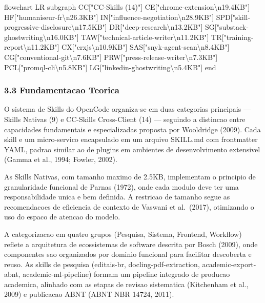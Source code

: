 \documentclass[
  12pt,
]{article}
\newenvironment{Shaded}{}{}
\newcommand{\NormalTok}[1]{#1}
\begin{document}
\begin{Shaded}
\begin{Highlighting}[]
\NormalTok{flowchart LR}
\NormalTok{subgraph CC["CC{-}Skills (14)"]}
\NormalTok{CE["chrome{-}extension\textbackslash{}n19.4KB"]}
\NormalTok{HF["humaniseur{-}fr\textbackslash{}n26.3KB"]}
\NormalTok{IN["influence{-}negotiation\textbackslash{}n28.9KB"]}
\NormalTok{SPD["skill{-}progressive{-}disclosure\textbackslash{}n17.5KB"]}
\NormalTok{DR["deep{-}research\textbackslash{}n13.2KB"]}
\NormalTok{SG["substack{-}ghostwriting\textbackslash{}n16.0KB"]}
\NormalTok{TAW["technical{-}article{-}writer\textbackslash{}n11.2KB"]}
\NormalTok{TR["training{-}report\textbackslash{}n11.2KB"]}
\NormalTok{CX["crxjs\textbackslash{}n10.9KB"]}
\NormalTok{SAS["snyk{-}agent{-}scan\textbackslash{}n8.4KB"]}
\NormalTok{CG["conventional{-}git\textbackslash{}n7.6KB"]}
\NormalTok{PRW["press{-}release{-}writer\textbackslash{}n7.3KB"]}
\NormalTok{PCL["promql{-}cli\textbackslash{}n5.8KB"]}
\NormalTok{LG["linkedin{-}ghostwriting\textbackslash{}n5.4KB"]}
\NormalTok{end}
\end{Highlighting}
\end{Shaded}

\subsubsection{3.3 Fundamentacao Teorica}\label{fundamentacao-teorica-2}

O sistema de Skills do OpenCode organiza-se em duas categorias
principais --- Skills Nativas (9) e CC-Skills Cross-Client (14) ---
seguindo a distincao entre capacidades fundamentais e especializadas
proposta por Wooldridge (2009). Cada skill e um micro-servico
encapsulado em um arquivo SKILL.md com frontmatter YAML, padrao similar
ao de plugins em ambientes de desenvolvimento extensivel (Gamma et al.,
1994; Fowler, 2002).

As Skills Nativas, com tamanho maximo de 2.5KB, implementam o principio
de granularidade funcional de Parnas (1972), onde cada modulo deve ter
uma responsabilidade unica e bem definida. A restricao de tamanho segue
as recomendacoes de eficiencia de contexto de Vaswani et al.~(2017),
otimizando o uso do espaco de atencao do modelo.

A categorizacao em quatro grupos (Pesquisa, Sistema, Frontend, Workflow)
reflete a arquitetura de ecossistemas de software descrita por Bosch
(2009), onde componentes sao organizados por dominio funcional para
facilitar descoberta e reuso. As skills de pesquisa (editais-br,
docling-pdf-extraction, academic-export-abnt, academic-ml-pipeline)
formam um pipeline integrado de producao academica, alinhado com as
etapas de revisao sistematica (Kitchenham et al., 2009) e publicacao
ABNT (ABNT NBR 14724, 2011).
\end{document}
